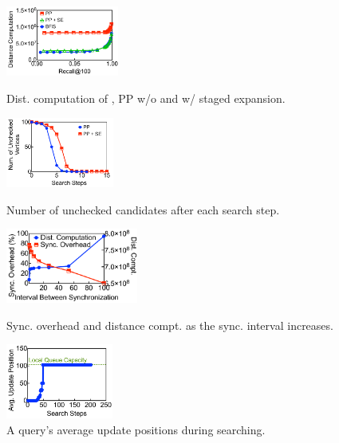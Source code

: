 \begin{figure}[t]
\begin{minipage}[t]{0.23\textwidth}
    \centering
    \includegraphics[height=0.91in]{submissions/Minjia2023/figures/insight_1T_compt_Scale_M_vs_Top_M_vs_SGS}
    \caption{Dist. computation of \SeqShortName, PP w/o and w/ staged expansion.}
    \label{minjia_subfig:insight_1T_compt_Scale_M_vs_Top_M_vs_SGS}
\end{minipage}
\hfill
\begin{minipage}[t]{0.23\textwidth}
    \centering
    \includegraphics[height=0.91in]{submissions/Minjia2023/figures/insight_unchecked_vs_iter_Top_M_Scale_M}
    \caption{Number of unchecked candidates after each search step. }
    \label{minjia_subfig:insight_unchecked_vs_iter_Top_M_Scale_M}
\end{minipage}
\hfill
    \begin{minipage}[t]{0.23\textwidth}
        \centering
        \includegraphics[height=0.97in]{submissions/Minjia2023/figures/insight_PSS_sync_interval_vs_overhead}
        \caption{
            {Sync. overhead and distance compt. as the sync. interval increases.}}
        \label{minjia_fig:insight_PSS_sync_interval_vs_overhead}
    \end{minipage}
    \hfill
    \begin{minipage}[t]{0.23\textwidth}
        \centering
        \includegraphics[height=0.97in]{submissions/Minjia2023/figures/insight_PSS_update_position_example}
        \caption{A query's average update positions during searching.
        }
        \label{minjia_fig:insight_PSS_update_position_example}
    \end{minipage}
\end{figure}

